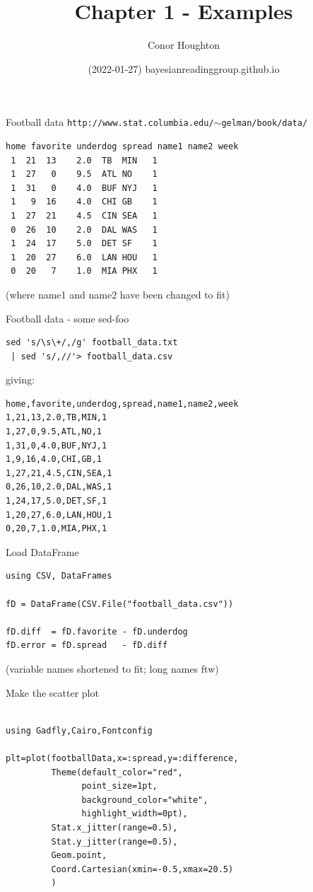 \documentclass{beamer}
\title[Chapter 1]{Chapter 1 - Examples}
\author{Conor Houghton}
\institute{reading Gelman}
\date{(2022-01-27) bayesianreadinggroup.github.io}
\begin{document}
\maketitle

\begin{frame}[fragile]{Football data}
\texttt{http://www.stat.columbia.edu/$\sim$gelman/book/data/}

\begin{verbatim}
home favorite underdog spread name1 name2 week
 1  21  13    2.0  TB  MIN   1
 1  27   0    9.5  ATL NO    1
 1  31   0    4.0  BUF NYJ   1
 1   9  16    4.0  CHI GB    1
 1  27  21    4.5  CIN SEA   1
 0  26  10    2.0  DAL WAS   1
 1  24  17    5.0  DET SF    1
 1  20  27    6.0  LAN HOU   1
 0  20   7    1.0  MIA PHX   1
\end{verbatim}
\vfill
\color{gray}
(where name1 and name2 have been changed to fit)
\color{black}
\end{frame}


\begin{frame}[fragile]{Football data - some sed-foo}
\begin{verbatim}
sed 's/\s\+/,/g' football_data.txt
 | sed 's/,//'> football_data.csv
\end{verbatim}
\color{red}giving:\color{black}
\begin{verbatim}
home,favorite,underdog,spread,name1,name2,week
1,21,13,2.0,TB,MIN,1
1,27,0,9.5,ATL,NO,1
1,31,0,4.0,BUF,NYJ,1
1,9,16,4.0,CHI,GB,1
1,27,21,4.5,CIN,SEA,1
0,26,10,2.0,DAL,WAS,1
1,24,17,5.0,DET,SF,1
1,20,27,6.0,LAN,HOU,1
0,20,7,1.0,MIA,PHX,1
\end{verbatim}
\end{frame}

\begin{frame}[fragile]{Load DataFrame}
\begin{lstlisting}
using CSV, DataFrames

fD = DataFrame(CSV.File("football_data.csv"))

fD.diff  = fD.favorite - fD.underdog
fD.error = fD.spread   - fD.diff
\end{lstlisting}
\vfill
\color{gray}
(variable names shortened to fit; long names ftw)
\color{black}

\end{frame}

\begin{frame}[fragile]{Make the scatter plot}
  \begin{lstlisting}

using Gadfly,Cairo,Fontconfig

plt=plot(footballData,x=:spread,y=:difference,
         Theme(default_color="red",
               point_size=1pt,
               background_color="white",
               highlight_width=0pt),
         Stat.x_jitter(range=0.5),
         Stat.y_jitter(range=0.5),
         Geom.point,
         Coord.Cartesian(xmin=-0.5,xmax=20.5)
         )
  \end{lstlisting}
  \end{frame}
\end{document}
